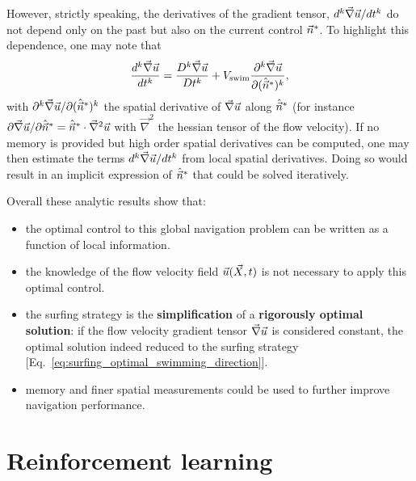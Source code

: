 However, strictly speaking, the derivatives of the gradient tensor, $d^k \vec{\nabla} \vec{u} / dt^k$ do not depend only on the past but also on the current control $\vec{n}^*$.
To highlight this dependence, one may note that
\begin{equation}\label{eq:link_to_spatial_derivatives}
	\frac{d^k \vec{\nabla} \vec{u}}{dt^k} = \frac{D^k \vec{\nabla} \vec{u}}{D t^k} + V_{\mathrm{swim}} \frac{\partial^k \vec{\nabla} \vec{u}}{\partial (\hat{\vec{n}}^* )^k},
\end{equation}
with $\partial^k \vec{\nabla} \vec{u}/\partial (\hat{\vec{n}}^*)^k$ the spatial derivative of $\vec{\nabla} \vec{u}$ along $\hat{\vec{n}}^*$ (for instance $\partial \vec{\nabla} \vec{u}/\partial \hat{\vec{n}}^* = \hat{\vec{n}}^* \cdot \vec{\nabla}^2 \vec{u}$ with $\vec{\nabla}^2$ the hessian tensor of the flow velocity).
If no memory is provided but high order spatial derivatives can be computed, one may then estimate the terms $d^k \vec{\nabla} \vec{u}/dt^k$ from local spatial derivatives.
Doing so would result in an implicit expression of $\hat{\vec{n}}^*$ that could be solved iteratively.

Overall these analytic results show that:
\begin{itemize}
	\item the optimal control to this global navigation problem can be written as a function of local information.
	\item the knowledge of the flow velocity field $\vec{u}(\vec{X}, t)$ is not necessary to apply this optimal control.
	\item the surfing strategy is the \textbf{simplification} of a \textbf{rigorously optimal solution}: if the flow velocity gradient tensor $\vec{\nabla} \vec{u}$ is considered constant, the optimal solution indeed reduced to the surfing strategy [Eq.~\eqref{eq:surfing_optimal_swimming_direction}].
	\item memory and finer spatial measurements could be used to further improve navigation performance.
\end{itemize}

\section{Reinforcement learning}

